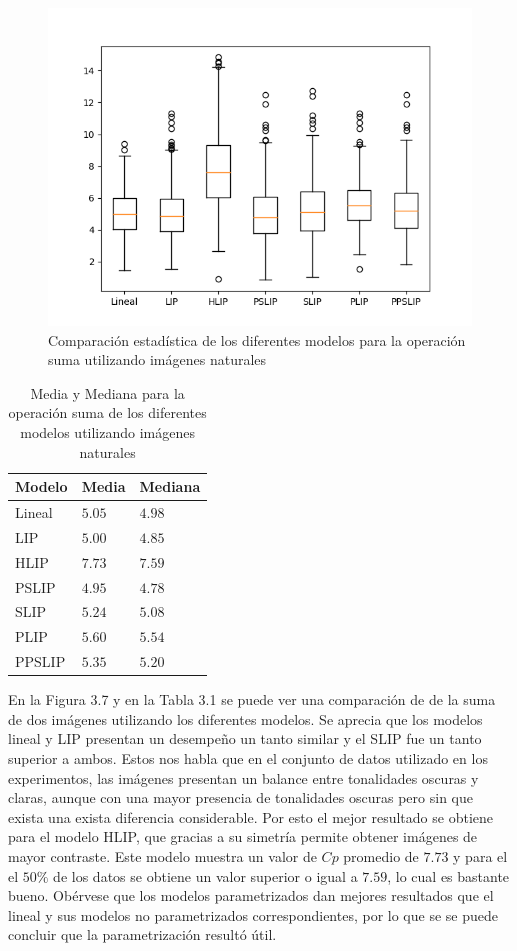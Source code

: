 \begin{figure}
	\begin{center}
		\includegraphics[width=10.0 cm]{images/graphics/sum_all.png}
		\caption{Comparaci\'on estad\'istica de los diferentes modelos para la operaci\'on suma utilizando im\'agenes naturales}
	\end{center}
\end{figure}

\begin{table}
	\begin{center}
		\begin{tabular}{|l|l|l|}
			\hline 
			Modelo & Media & Mediana\\
			\hline
			Lineal & $5.05$ & $4.98$\\
			\hline
			LIP & $5.00$ & $4.85$\\
			\hline
			HLIP & $7.73$ & $7.59$\\
			\hline
			PSLIP & $4.95$ & $4.78$\\
			\hline
			SLIP & $5.24$ & $5.08$\\
			\hline
			PLIP & $5.60$ & $5.54$\\
			\hline
			PPSLIP & $5.35$ & $5.20$\\
			\hline
		\end{tabular}
		\caption{Media y Mediana para la operaci\'on suma de los diferentes modelos utilizando im\'agenes naturales}
	\end{center}
\end{table}

En la Figura 3.7 y en la Tabla 3.1 se puede ver una comparaci\'on de de la suma de dos im\'agenes utilizando los diferentes modelos. Se aprecia que los modelos lineal y LIP presentan un desempe\~no un tanto similar y el SLIP fue un tanto superior a ambos. Estos nos habla que en el conjunto de datos utilizado en los experimentos, las im\'agenes presentan un balance entre tonalidades oscuras y claras, aunque con una mayor presencia de tonalidades oscuras pero sin que exista una exista diferencia considerable. Por esto el mejor resultado se obtiene para el modelo HLIP, que gracias a su simetr\'ia permite obtener im\'agenes de mayor contraste. Este modelo muestra un valor de $Cp$ promedio de $7.73$ y para el el $50\%$ de los datos se obtiene un valor superior o igual a $7.59$, lo cual es bastante bueno. Ob\'ervese que los modelos parametrizados dan mejores resultados que el lineal y sus modelos no parametrizados correspondientes, por lo que se se puede concluir que la parametrizaci\'on result\'o \'util.  

